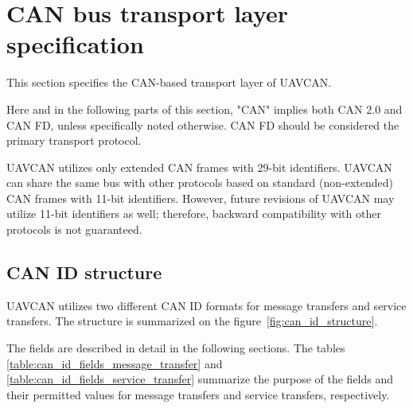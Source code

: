 \section{CAN bus transport layer specification}

This section specifies the CAN-based transport layer of UAVCAN.

Here and in the following parts of this section,
"CAN" implies both CAN 2.0 and CAN FD, unless specifically noted otherwise.
CAN FD should be considered the primary transport protocol.

UAVCAN utilizes only extended CAN frames with 29-bit identifiers.
UAVCAN can share the same bus with other protocols based on standard (non-extended) CAN frames with 11-bit identifiers.
However, future revisions of UAVCAN may utilize 11-bit identifiers as well;
therefore, backward compatibility with other protocols is not guaranteed.

\subsection{CAN ID structure}

UAVCAN utilizes two different CAN ID formats for message transfers and service transfers.
The structure is summarized on the figure~\ref{fig:can_id_structure}.

The fields are described in detail in the following sections.
The tables \ref{table:can_id_fields_message_transfer} and \ref{table:can_id_fields_service_transfer}
summarize the purpose of the fields and their permitted values
for message transfers and service transfers, respectively.

